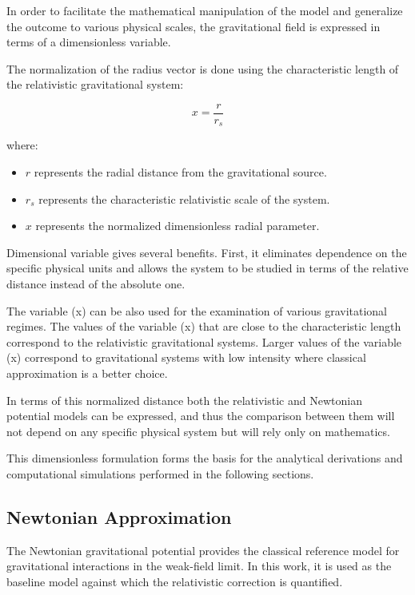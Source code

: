 \documentclass[
]{article}
\begin{document}
In order to facilitate the mathematical manipulation of the model and
generalize the outcome to various physical scales, the gravitational
field is expressed in terms of a dimensionless variable.

The normalization of the radius vector is done using the characteristic
length of the relativistic gravitational system:

\[
x=\frac{r}{r_s}
\]

where:
\begin{itemize}
\item $r$ represents the radial distance from the gravitational source.
\item $r_s$ represents the characteristic relativistic scale of the system.
\item $x$ represents the normalized dimensionless radial parameter.
\end{itemize}

Dimensional variable gives several benefits. First, it eliminates
dependence on the specific physical units and allows the system to be
studied in terms of the relative distance instead of the absolute one.

The variable (x) can be also used for the examination of various
gravitational regimes. The values of the variable (x) that are close to
the characteristic length correspond to the relativistic gravitational
systems. Larger values of the variable (x) correspond to gravitational
systems with low intensity where classical approximation is a better
choice.

In terms of this normalized distance both the relativistic and Newtonian
potential models can be expressed, and thus the comparison between them
will not depend on any specific physical system but will rely only on
mathematics.

This dimensionless formulation forms the basis for the analytical
derivations and computational simulations performed in the following
sections.

\subsection{Newtonian Approximation}\label{newtonian-approximation}

The Newtonian gravitational potential provides the classical reference
model for gravitational interactions in the weak-field limit. In this
work, it is used as the baseline model against which the relativistic
correction is quantified.
\end{document}
